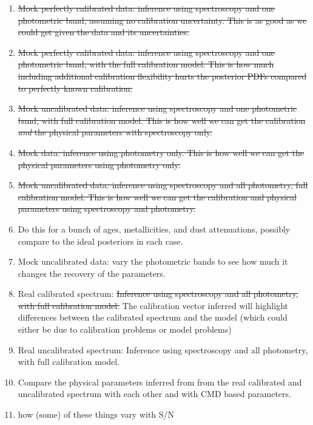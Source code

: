 \documentclass[iop,numberedappendix]{emulateapj}
\begin{document}
\begin{enumerate}

\item \sout{Mock perfectly calibrated data: inference using spectroscopy and one
  photometric band, assuming no calibration uncertainty.  This is as
  good as we could get given the data and its uncertainties.}

\item \sout{Mock perfectly calibrated data: inference using spectroscopy and one
  photometric band, with the full calibration model.  This is how much
  including additional calibration flexibility hurts the posterior
  PDFs compared to perfectly known calibration.}

\item \sout{Mock uncalibrated data:  inference using spectroscopy and one
  photometric band, with full calibration model.  This is how well we
  can get the calibration \emph{and} the physical parameters with
  spectroscopy only.}

\item \sout{Mock data: inference using photometry only.  This is how well we
  can get the physical parameters using photometry only.}

\item \sout{Mock uncalibrated data: inference using spectroscopy and all
  photometry, full calibration model.  This is how well we
  can get the calibration and physical parameters using spectroscopy
  and photometry.}

\item Do this for a bunch of ages, metallicities, and dust
  attenuations, possibly compare to the ideal posteriors in each case.

\item Mock uncalibrated data:  vary the photometric bands to see how
  much it changes the recovery of the parameters.

\item Real calibrated spectrum:   \sout{Inference using spectroscopy and all
  photometry, with full calibration model.} The calibration vector
  inferred will highlight differences between the calibrated spectrum
  and the model (which could either be due to calibration problems or
  model problems)

\item Real uncalibrated spectrum:   Inference using spectroscopy and all
  photometry, with full calibration model. 

\item Compare the physical parameters inferred from from the real
  calibrated and uncalibrated spectrum with each other and with CMD
  based parameters.


\item how (some) of these things vary with S/N

\end{enumerate}
\end{document}

